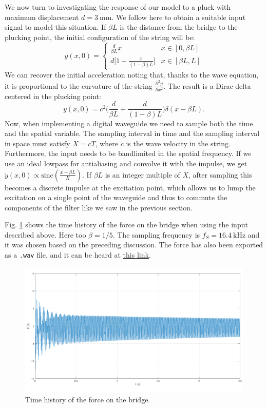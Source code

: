 \documentclass[a4paper]{article}
\begin{document}
We now turn to investigating the response of our model to a pluck with maximum displacement $d = \SI{3}{\milli\meter}$. We follow here \cite{smith92} to obtain a suitable input signal to model this situation. If $\beta L$ is the distance from the bridge to the plucking point, the initial configuration of the string will be:
$$ 
y(x, 0) = \left\{
	\begin{array}{lr}
		\frac{d}{\beta L}x & x \in [0, \beta L] \\[4pt]
		d \bigl[ 1 - \frac{x}{(1 - \beta) L} \bigr] & x \in [\beta L, L]
	\end{array}
\right.
$$
We can recover the initial acceleration noting that, thanks to the wave equation, it is proportional to the curvature of the string $\frac{\partial^2 y}{\partial x^2}$. The result is a Dirac delta centered in the plucking point:
$$
\ddot y(x, 0) = c^2 \biggl( \frac{d}{\beta L} + \frac{d}{(1 - \beta) L} \biggr) \delta(x - \beta L).
$$
Now, when implementing a digital waveguide we need to sample both the time and the spatial variable. The sampling interval in time and the sampling interval in space must satisfy $X = cT$, where $c$ is the wave velocity in the string. Furthermore, the input needs to be bandlimited in the spatial frequency. If we use an ideal lowpass for antialiasing and convolve it with the impulse, we get $\ddot y (x, 0) \propto \mathrm{sinc}\left( \frac{x-\beta L}{X} \right)$. If $\beta L$ is an integer multiple of $X$, after sampling this becomes a discrete impulse at the excitation point, which allows us to lump the excitation on a single point of the waveguide and thus to commute the components of the filter like we saw in the previous section.

Fig. \ref{fig:dleng} shows the time history of the force on the bridge when using the input described above. Here too $\beta = 1/5$. The sampling frequency is $f_S = \SI{16.4}{\kilo\hertz}$ and it was chosen based on the preceding discussion. The force has also been exported as a \texttt{.wav} file, and it can be heard at \href{https://polimi365-my.sharepoint.com/personal/10743504_polimi_it/_layouts/15/onedrive.aspx?id=%2Fpersonal%2F10743504%5Fpolimi%5Fit%2FDocuments%2Fout%5Frender%2Ewav&parent=%2Fpersonal%2F10743504%5Fpolimi%5Fit%2FDocuments&originalPath=aHR0cHM6Ly9wb2xpbWkzNjUtbXkuc2hhcmVwb2ludC5jb20vOnU6L2cvcGVyc29uYWwvMTA3NDM1MDRfcG9saW1pX2l0L0Vka281U0p1a1RsQXQxeTd3WGgyWW1FQlo4UDFhYnIwSXNweUJNU2cyRWV5aWc_cnRpbWU9c0tjQy1UaWgyRWc}{this link}.


\begin{figure}[h]
	\centering
	\includegraphics[width=0.75\linewidth]{time.png}
	\caption{Time history of the force on the bridge.}
	\label{fig:dleng}
\end{figure}


\printbibliography
\end{document}
